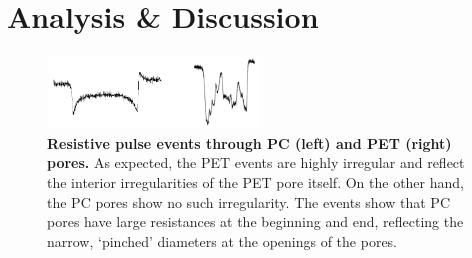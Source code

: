 	
	\section{Analysis \& Discussion}
	
	
		\begin{figure}
			\includegraphics[width=0.5\textwidth]{PCPETevents}
			\caption{\textbf{Resistive pulse events through PC (left) and PET (right) pores.} As expected, the PET events are highly irregular and reflect the interior irregularities of the PET pore itself. On the other hand, the PC pores show no such irregularity. The events show that PC pores have large resistances at the beginning and end, reflecting the narrow, `pinched' diameters at the openings of the pores.}
			\label{fig:PCPETevents}
		\end{figure}

	
	
